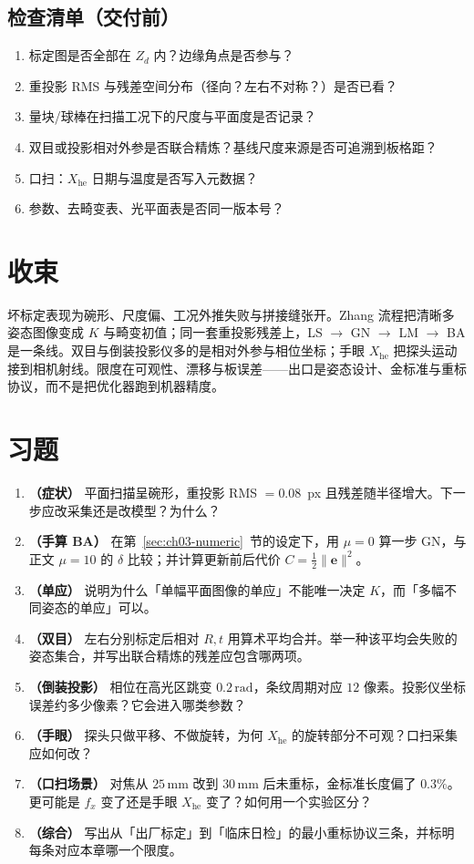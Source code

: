 \subsection{检查清单（交付前）}

\begin{enumerate}
  \item 标定图是否全部在 $Z_d$ 内？边缘角点是否参与？
  \item 重投影 RMS 与残差空间分布（径向？左右不对称？）是否已看？
  \item 量块/球棒在扫描工况下的尺度与平面度是否记录？
  \item 双目或投影相对外参是否联合精炼？基线尺度来源是否可追溯到板格距？
  \item 口扫：$X_{\mathrm{he}}$ 日期与温度是否写入元数据？
  \item 参数、去畸变表、光平面表是否同一版本号？
\end{enumerate}

\section*{收束}

坏标定表现为碗形、尺度偏、工况外推失败与拼接缝张开。Zhang 流程把清晰多姿态图像变成 $K$ 与畸变初值；同一套重投影残差上，LS $\to$ GN $\to$ LM $\to$ BA 是一条线。双目与倒装投影仪多的是相对外参与相位坐标；手眼 $X_{\mathrm{he}}$ 把探头运动接到相机射线。限度在可观性、漂移与板误差——出口是姿态设计、金标准与重标协议，而不是把优化器跑到机器精度。

\section{习题}

\begin{enumerate}
  \item \textbf{（症状）} 平面扫描呈碗形，重投影 RMS $=0.08$~px 且残差随半径增大。下一步应改采集还是改模型？为什么？
  \item \textbf{（手算 BA）} 在第~\ref{sec:ch03-numeric}~节的设定下，用 $\mu=0$ 算一步 GN，与正文 $\mu=10$ 的 $\delta$ 比较；并计算更新前后代价 $C=\frac12\|\boldsymbol e\|^2$。
  \item \textbf{（单应）} 说明为什么「单幅平面图像的单应」不能唯一决定 $K$，而「多幅不同姿态的单应」可以。
  \item \textbf{（双目）} 左右分别标定后相对 $R,t$ 用算术平均合并。举一种该平均会失败的姿态集合，并写出联合精炼的残差应包含哪两项。
  \item \textbf{（倒装投影）} 相位在高光区跳变 $0.2\,\mathrm{rad}$，条纹周期对应 $12$ 像素。投影仪坐标误差约多少像素？它会进入哪类参数？
  \item \textbf{（手眼）} 探头只做平移、不做旋转，为何 $X_{\mathrm{he}}$ 的旋转部分不可观？口扫采集应如何改？
  \item \textbf{（口扫场景）} 对焦从 $25\,\mathrm{mm}$ 改到 $30\,\mathrm{mm}$ 后未重标，金标准长度偏了 $0.3\%$。更可能是 $f_x$ 变了还是手眼 $X_{\mathrm{he}}$ 变了？如何用一个实验区分？
  \item \textbf{（综合）} 写出从「出厂标定」到「临床日检」的最小重标协议三条，并标明每条对应本章哪一个限度。
\end{enumerate}

